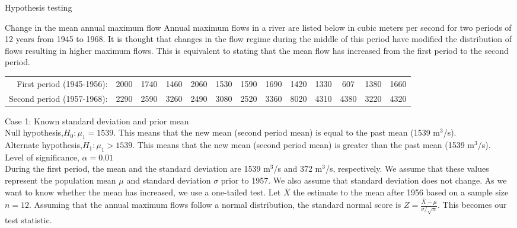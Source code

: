 \documentclass[8pt]{beamer}
\renewcommand{\emph}[1]{\textcolor{myorange}{#1}}
\begin{document}
\begin{frame}{Hypothesis testing}

    \begin{exampleblock}{Change in  the mean annual maximum flow}
Annual maximum flows in  a river  are listed below in cubic meters per second for two periods of 12 years from 1945 to 1968. It is thought that changes in the flow regime during the middle of this period have modified the distribution of flows resulting in higher maximum flows. This is equivalent to stating that the mean flow has increased from the first period to the second period.
\setlength{\tabcolsep}{1pt} %
  \begin{tabular}{rcccccccccccc}
      First period (1945-1956): & 2000 & 1740 & 1460 & 2060 & 1530 & 1590 & 1690 & 1420 & 1330 & 607 & 1380 & 1660 \\
Second period (1957-1968): & 2290 & 2590 & 3260 & 2490 & 3080 & 2520 & 3360 & 8020 & 4310 & 4380 & 3220 & 4320
  \end{tabular}
    \alert{Case 1: Known standard deviation and prior mean}\\
    \emph{Null hypothesis},$H_0 : \mu_1 = 1539$. This means that the new mean (second period mean) is equal to the past mean (1539 m$^3$/s).\\
    \emph{Alternate hypothesis},$H_1 : \mu_1 > 1539$. This means that the new mean (second period mean) is greater than the past mean (1539 m$^3$/s).\\
    \emph{Level of significance}, $\alpha = 0.01$ \\
    During the first period, the mean and the standard deviation are 1539 m$^3$/s and 372 m$^3$/s, respectively. We assume that these values  represent the population mean $\mu$ and standard deviation $\sigma$ prior to 1957. We also assume that standard deviation does not change. As we want to know whether the mean has increased, we use a \emph{one-tailed test}. 
    Let $\bar{X}$ the estimate to the mean after 1956 based on a sample size $n=12$. Assuming that the annual maximum flows follow a \emph{normal distribution}, the \emph{standard normal score} is $Z = \frac{\bar{X} - \mu}{\sigma/\sqrt{n}}$. This becomes our \emph{test statistic}. \\
    
    \end{exampleblock}

\end{frame}
\end{document}
